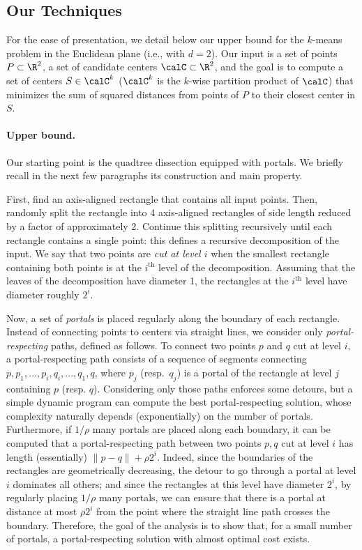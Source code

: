 \subsection{Our Techniques}\label{sec:overview}
For the ease of presentation, we detail below our upper bound for the $k$-means problem in the Euclidean plane (i.e., with $d=2$). Our input is a set of points  $P \subset \R^2$, a set of candidate centers $\calC\subset \R^2$, and the goal is to compute a set of centers $S \in \calC^k$ ($\calC^k$ is the $k$-wise partition product of $\calC$) that minimizes the sum of  squared distances from points of $P$ to their closest center in $S$.


\paragraph*{Upper bound.} Our starting point is the quadtree dissection equipped with portals. We briefly recall in the next few  paragraphs its construction and main property. 

First, find an axis-aligned rectangle that contains all input points. Then, randomly split the rectangle into 4 axis-aligned rectangles of side length reduced by a factor of approximately 2. Continue this splitting recursively until each rectangle contains a single point: this defines a recursive decomposition of the input. 
We say that two points are \textit{cut at level $i$} when the smallest rectangle containing both points is at the $i^{\text{th}}$ level of the decomposition. Assuming that the leaves of the decomposition have diameter 1, the rectangles at the $i^{\text{th}}$ level have diameter roughly $2^i$.

Now, a set of \emph{portals} is placed regularly along the boundary of each rectangle. 
Instead of connecting points to centers via straight lines, we consider only \emph{portal-respecting} paths, defined as follows. To connect two points $p$ and $q$ cut at level $i$, a portal-respecting path consists of a sequence of segments connecting $p, p_1, ..., p_i, q_i, ..., q_1, q$, where $p_j$ (resp.\ $q_j$) is a portal of the rectangle at level $j$ containing $p$ (resp. $q$). 
Considering only those paths enforces some detours, but a simple dynamic program can compute the best portal-respecting solution, whose complexity naturally depends (exponentially) on the number of portals. 
Furthermore, if $1/\rho$ many portals are placed along each boundary, it can be computed that a portal-respecting path between two points $p, q$ cut at level $i$ has length (essentially) $\|p-q\| + \rho 2^i$. Indeed, since the boundaries of the rectangles are  geometrically decreasing, the detour to go through a portal at level $i$ dominates all others; and since the rectangles at this level have diameter $2^i$, by regularly placing    $1/\rho$ many portals, we can ensure that there is a portal at distance at most $\rho 2^i$ from the point where the straight line path crosses the boundary.
Therefore, the goal of the analysis is to show that, for a small number of portals, a portal-respecting solution with almost optimal cost exists. 

